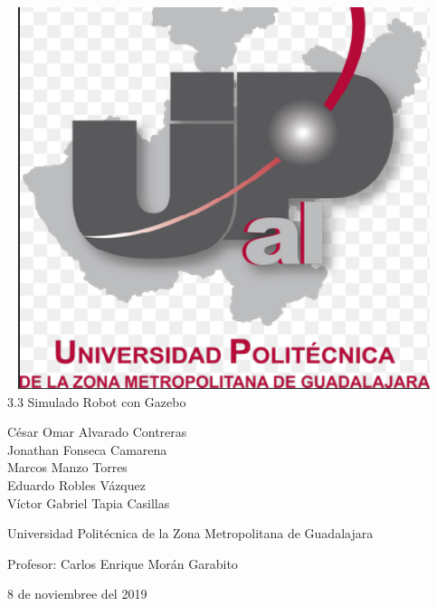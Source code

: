 \documentclass[11pt,a4paper,oldfontcommands,oneside]{memoir}
\begin{document}
%
%
\thispagestyle{empty}

{%
\sffamily
\centering
\Large

~\vspace{\fill}
\includegraphics[scale=0.5]{marcos.png} \\
{\huge 
\vspace{2cm}
3.3 Simulado Robot con Gazebo
}
\vspace{2.5cm}

{\LARGE
César Omar Alvarado Contreras \\
Jonathan Fonseca Camarena \\
Marcos Manzo Torres \\
Eduardo Robles Vázquez \\
Víctor Gabriel Tapia Casillas

}

\vspace{2.5cm}

Universidad Politécnica de la Zona Metropolitana de Guadalajara

\vspace{3.5cm}

Profesor: Carlos Enrique Morán Garabito

\vspace{\fill}

8 de noviembree del 2019

}%
\end{document}
